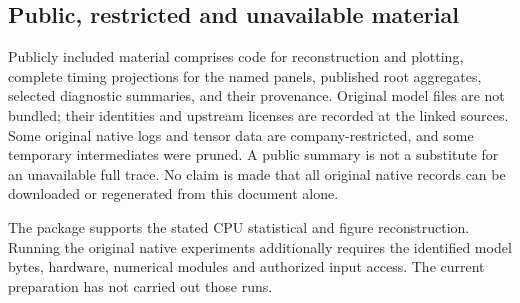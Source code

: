 \subsection{Public, restricted and unavailable material}
Publicly included material comprises code for reconstruction and plotting, complete timing projections for the named panels, published root aggregates, selected diagnostic summaries, and their provenance. Original model files are not bundled; their identities and upstream licenses are recorded at the linked sources. Some original native logs and tensor data are company-restricted, and some temporary intermediates were pruned. A public summary is not a substitute for an unavailable full trace. No claim is made that all original native records can be downloaded or regenerated from this document alone.

The package supports the stated CPU statistical and figure reconstruction. Running the original native experiments additionally requires the identified model bytes, hardware, numerical modules and authorized input access. The current preparation has not carried out those runs.
